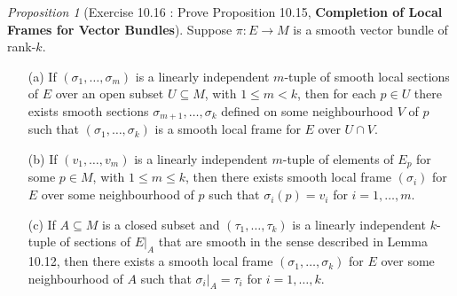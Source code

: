\documentclass[a4paper]{article}
\theoremstyle{remark}
\newtheorem{prop}{Proposition}
\newcommand{\subhim}{\subseteq} %
\begin{document}
\begin{prop}[Exercise 10.16 : Prove Proposition 10.15, \textbf{Completion of Local Frames for Vector Bundles}]
Suppose $\pi :E \to M$ is a smooth vector bundle of rank-$k$.
\begin{enumerate}
\item[(a)] If $(\sigma_1,\dots,\sigma_m)$ is a linearly independent $m$-tuple of smooth local sections of $E$ over an open subset $U \subhim M$, with $1 \leq m < k$, then for each $p \in U$ there exists smooth sections $\sigma_{m+1}, \dots , \sigma_k$ defined on some neighbourhood $V$ of $p$ such that $(\sigma_1,\dots, \sigma_k)$ is a smooth local frame for $E$ over $U \cap V$.
\item[(b)] If $(v_1,\dots,v_m)$ is a linearly independent $m$-tuple of elements of $E_p$ for some $p \in M$, with $1 \leq m \leq k$, then there exists smooth local frame $(\sigma_i)$ for $E$ over some neighbourhood of $p$ such that $\sigma_i(p) = v_i$ for $i=1,\dots,m$. 
\item[(c)] If $A \subhim M$ is a closed subset and $(\tau_1,\dots,\tau_k)$ is a linearly independent $k$-tuple of sections of $E|_A$ that are smooth in the sense described in Lemma 10.12, then there exists a smooth local frame $(\sigma_1,\dots,\sigma_k)$ for $E$ over some neighbourhood of $A$ such that $\sigma_i|_A = \tau_i$ for $i=1,\dots,k$.
\end{enumerate}
\end{prop}
\end{document}
